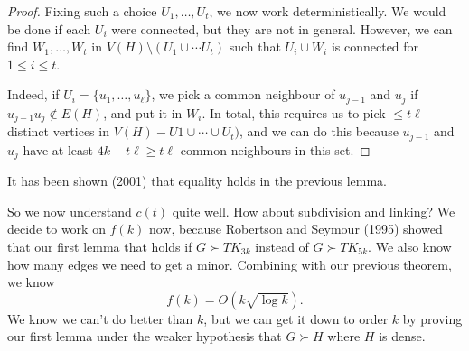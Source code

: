 \documentclass[a4paper]{article}
\begin{document}
\begin{proof}
  Fixing such a choice $U_1, \ldots, U_t$, we now work deterministically. We would be done if each $U_i$ were connected, but they are not in general. However, we can find $W_1, \ldots, W_t$ in $V(H) \setminus (U_1 \cup \cdots U_t)$ such that $U_i \cup W_i$ is connected for $1 \leq i \leq t$.

  Indeed, if $U_i = \{u_1, \ldots, u_\ell\}$, we pick a common neighbour of $u_{j - 1}$ and $u_j$ if $u_{j - 1} u_j \not \in E(H)$, and put it in $W_i$. In total, this requires us to pick $\leq t\ell$ distinct vertices in $V(H) - U1 \cup \cdots \cup U_t)$, and we can do this because $u_{j - 1}$ and $u_j$ have at least $4k - t\ell \geq t\ell$ common neighbours in this set.
\end{proof}

It has been shown (2001) that equality holds in the previous lemma.

So we now understand $c(t)$ quite well. How about subdivision and linking? We decide to work on $f(k)$ now, because Robertson and Seymour (1995) showed that our first lemma that holds if $G \succ TK_{3k}$ instead of $G \succ TK_{5k}$. We also know how many edges we need to get a minor. Combining with our previous theorem, we know
\[
  f(k) = O(k \sqrt{\log k}).
\]
We know we can't do better than $k$, but we can get it down to order $k$ by proving our first lemma under the weaker hypothesis that $G \succ H$ where $H$ is dense.
\printindex
\end{document}

